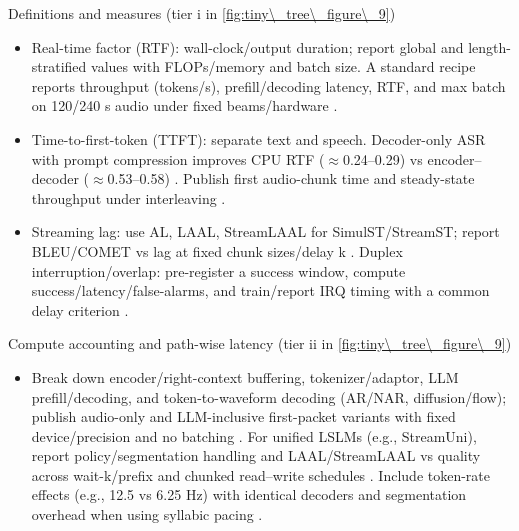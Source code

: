 \documentclass{article}
\begin{document}
Definitions and measures (tier i in \autoref{fig:tiny\_tree\_figure\_9})
\begin{itemize}
  \item Real-time factor (RTF): wall-clock/output duration; report global and length-stratified values with FLOPs/memory and batch size. A standard recipe reports throughput (tokens/s), prefill/decoding latency, RTF, and max batch on 120/240 s audio under fixed beams/hardware \cite{lu2024fastadaspmultitaskadaptedefficientinfere}.
  \item Time-to-first-token (TTFT): separate text and speech. Decoder-only ASR with prompt compression improves CPU RTF ($\approx$0.24--0.29) vs encoder--decoder ($\approx$0.53--0.58) \cite{tsunoo2024decoderonlyarchitecturespeechrecognition}. Publish first audio-chunk time and steady-state throughput under interleaving \cite{lu2024fastadaspmultitaskadaptedefficientinfere}.
  \item Streaming lag: use AL, LAAL, StreamLAAL for SimulST/StreamST; report BLEU/COMET vs lag at fixed chunk sizes/delay k \cite{guo2025streamuniachievingstreamingspeechtransla}. Duplex interruption/overlap: pre-register a success window, compute success/latency/false-alarms, and train/report IRQ timing with a common delay criterion \cite{ma2024languagemodelcanlistenwhilespeaking}.
\end{itemize}

Compute accounting and path-wise latency (tier ii in \autoref{fig:tiny\_tree\_figure\_9})
\begin{itemize}
  \item Break down encoder/right-context buffering, tokenizer/adaptor, LLM prefill/decoding, and token-to-waveform decoding (AR/NAR, diffusion/flow); publish audio-only and LLM-inclusive first-packet variants with fixed device/precision and no batching \cite{entry2025indicsuperbspeechprocessinguniversalperf,vashishth2024stabspeechtokenizerassessmentbenchmark}. For unified LSLMs (e.g., StreamUni), report policy/segmentation handling and LAAL/StreamLAAL vs quality across wait-k/prefix and chunked read--write schedules \cite{guo2025streamuniachievingstreamingspeechtransla}. Include token-rate effects (e.g., 12.5 vs 6.25 Hz) with identical decoders and segmentation overhead when using syllabic pacing \cite{baade2024syllablelmlearningcoarsesemanticunitsspe}.
\end{itemize}
\end{document}

